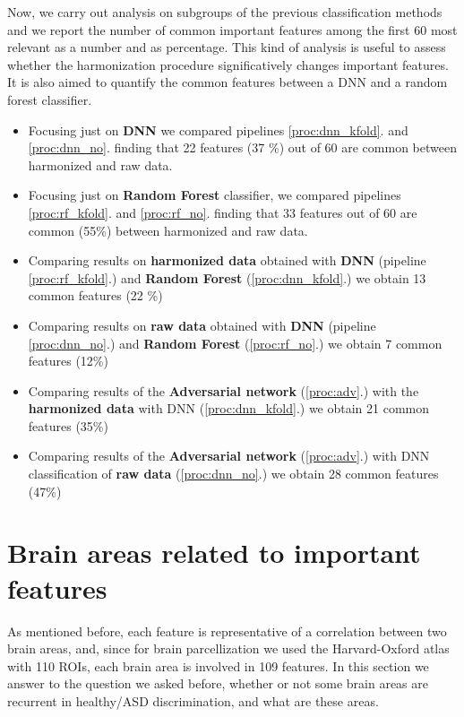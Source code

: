 \documentclass[11pt]{report}
\begin{document}
Now, we carry out analysis on subgroups of the previous classification methods and we report the number of common important features among the first 60 most relevant as a number and as percentage.
This kind of analysis is useful to assess whether the harmonization procedure significatively changes important features.
It is also aimed to quantify the common features between a DNN and a random forest classifier.

\begin{itemize}
\item Focusing just on \textbf{DNN} we compared pipelines \ref{proc:dnn_kfold}. and \ref{proc:dnn_no}. finding that 22 features (37 \%) out of 60 are common between harmonized and raw data.

\item Focusing just on \textbf{Random Forest} classifier, we compared pipelines \ref{proc:rf_kfold}. and \ref{proc:rf_no}. finding that 33 features out of 60 are common (55\%) between harmonized and raw data.

\item Comparing results on  \textbf{harmonized data} obtained with \textbf{DNN} (pipeline \ref{proc:rf_kfold}.) and \textbf{Random Forest} (\ref{proc:dnn_kfold}.) we obtain 13 common features (22 \%)

\item Comparing results on \textbf{raw data} obtained with \textbf{DNN} (pipeline \ref{proc:dnn_no}.) and \textbf{Random Forest} (\ref{proc:rf_no}.) we obtain 7 common features  (12\%)

\item Comparing results of the \textbf{Adversarial network} (\ref{proc:adv}.) with the \textbf{harmonized data} with DNN (\ref{proc:dnn_kfold}.) we obtain 21 common features (35\%)

\item Comparing results of the \textbf{Adversarial network} (\ref{proc:adv}.) with DNN classification of \textbf{raw data} (\ref{proc:dnn_no}.) we obtain 28 common features (47\%)
\end{itemize}



\section{Brain areas related to important features} \hfill

As mentioned before, each feature is representative of a correlation between two brain areas, and, since for brain parcellization we used the Harvard-Oxford atlas with 110 ROIs, each brain area is involved in 109 features.
In this section we answer to the question we asked before, whether or not some brain areas are recurrent in healthy/ASD discrimination, and what are these areas.
\end{document}
